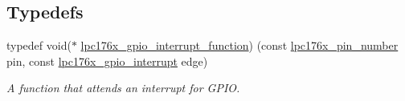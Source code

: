 \subsection*{Typedefs}
\begin{DoxyCompactItemize}
\item 
typedef void($\ast$ \mbox{\hyperlink{gpio-defs_8h_aee89c4be418a21db878253cdf558ecc5}{lpc176x\+\_\+gpio\+\_\+interrupt\+\_\+function}}) (const \mbox{\hyperlink{common-types_8h_a8215ced1557c43bc5925b691a3c1dc23}{lpc176x\+\_\+pin\+\_\+number}} pin, const \mbox{\hyperlink{gpio-defs_8h_afc30bf25b9862f6272f1bab077f8016b}{lpc176x\+\_\+gpio\+\_\+interrupt}} edge)
\begin{DoxyCompactList}\small\item\em A function that attends an interrupt for G\+P\+IO. \end{DoxyCompactList}\end{DoxyCompactItemize}
